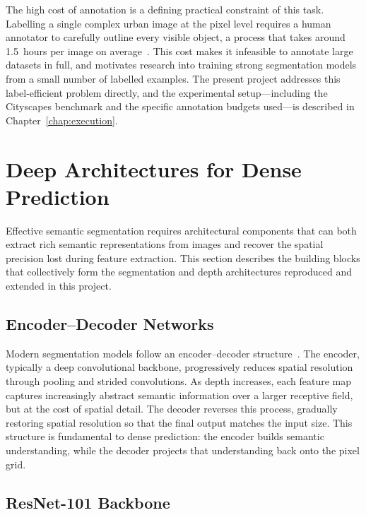 The high cost of annotation is a defining practical constraint of this
task. Labelling a single complex urban image at the pixel level requires
a human annotator to carefully outline every visible object, a process
that takes around 1.5~hours per image on average~\cite{cordts2016cityscapes}.
This cost makes it infeasible to annotate large datasets in full, and
motivates research into training strong segmentation models from a small
number of labelled examples. The present project addresses this
label-efficient problem directly, and the experimental setup---including
the Cityscapes benchmark and the specific annotation budgets
used---is described in Chapter~\ref{chap:execution}.

\section{Deep Architectures for Dense Prediction}
\label{sec:architectures}

Effective semantic segmentation requires architectural components that can
both extract rich semantic representations from images and recover the
spatial precision lost during feature extraction. This section describes the building blocks that collectively form the
segmentation and depth architectures reproduced and extended in this
project.

\subsection{Encoder--Decoder Networks}

Modern segmentation models follow an encoder--decoder
structure~\cite{long2015fully}. The encoder, typically a deep convolutional
backbone, progressively reduces spatial resolution through pooling and
strided convolutions. As depth increases, each feature map captures
increasingly abstract semantic information over a larger receptive field,
but at the cost of spatial detail. The decoder reverses this process,
gradually restoring spatial resolution so that the final output matches
the input size. This structure is fundamental to dense prediction: the
encoder builds semantic understanding, while the decoder projects that
understanding back onto the pixel grid.

\subsection{ResNet-101 Backbone}

